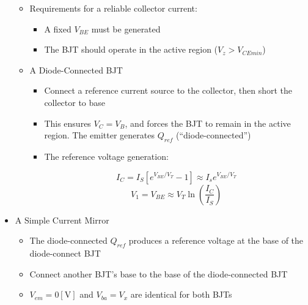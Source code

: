 \begin{itemize}
    \begin{itemize}

      \item Requirements for a reliable collector current:

        \begin{itemize}

          \item A fixed $V_{BE}$ must be generated

          \item The BJT should operate in the active region ($V_z>V_{CEmin}$)

        \end{itemize}

      \item A Diode-Connected BJT

        \begin{itemize}

          \item Connect a reference current source to the collector, then short the collector to base

          \item This ensures $V_C=V_B$, and forces the BJT to remain in the active region. The emitter generates $Q_{ref}$ (``diode-connected'')

          \item The reference voltage generation:

            $$I_C=I_S\left[ e^{V_{BE}/V_T}-1 \right]\approx I_se^{V_{BE}/V_T}$$
            $$V_1=V_{BE}\approx V_T\ln\left( \frac{I_C}{I_S} \right)$$

        \end{itemize}

    \end{itemize}

  \item A Simple Current Mirror

    \begin{itemize}

      \item The diode-connected $Q_{ref}$ produces a reference voltage at the base of the diode-connect BJT

      \item Connect another BJT's base to the base of the diode-connected BJT

      \item $V_{em}=0[\si{\volt}]$ and $V_{ba}=V_x$ are identical for both BJTs


\end{itemize}
\end{itemize}
